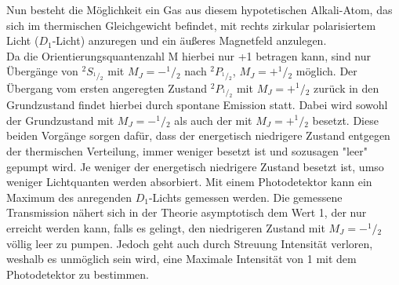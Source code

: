 Nun besteht die Möglichkeit ein Gas aus diesem hypotetischen Alkali-Atom, das sich im thermischen Gleichgewicht befindet,
mit rechts zirkular polarisiertem Licht ($D_1$-Licht) anzuregen und ein äußeres Magnetfeld anzulegen. \\
Da die Orientierungsquantenzahl M hierbei nur +1 betragen kann, sind nur Übergänge von ${}^2S_{^1\!/\!_2}$ mit  $M_J=-^1\!/\!_2$ nach ${}^2P_{^1\!/\!_2}$, $M_J=+^1\!/\!_2$ möglich.
Der Übergang vom ersten angeregten Zustand ${}^2P_{^1\!/\!_2}$ mit $M_J=+^1\!/\!_2$ zurück in den Grundzustand findet hierbei durch spontane
Emission statt. Dabei wird sowohl der Grundzustand mit $M_J=-^1\!/\!_2$
als auch der mit $M_J=+^1\!/\!_2$ besetzt. Diese beiden Vorgänge sorgen dafür, dass der energetisch niedrigere Zustand entgegen der thermischen Verteilung, immer weniger besetzt ist und sozusagen "leer" gepumpt wird.
Je weniger der energetisch niedrigere Zustand besetzt ist, umso weniger Lichtquanten werden absorbiert. Mit einem Photodetektor kann ein Maximum des anregenden $D_1$-Lichts gemessen werden. Die gemessene
Transmission nähert sich in der Theorie asymptotisch dem Wert 1, der nur erreicht werden kann, falls es gelingt, den niedrigeren Zustand mit $M_J=-^1\!/\!_2$ völlig leer zu pumpen. Jedoch geht auch durch Streuung Intensität verloren, weshalb es unmöglich sein wird, eine Maximale Intensität von 1 mit dem Photodetektor zu bestimmen.

